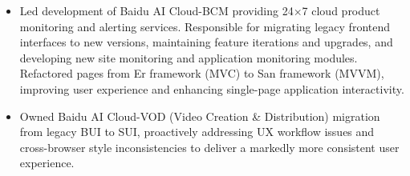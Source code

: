 \documentclass{resume}
\newcommand{\en}[1]{#1}
\newcommand{\zh}[1]{}
\begin{document}
\en{}
\zh{\datedsubsection{\textbf{\href{https://cloud.baidu.com/}{百度智能云（Baidu AI Cloud）}}}{2021/01 -- 2021/08}}
\en{}
\zh{\role{ACG 建站与云市场部}{前端研发实习}}
\begin{itemize}
    \item \en{Led development of Baidu AI Cloud-BCM providing 24×7 cloud product monitoring and alerting services. Responsible for migrating legacy frontend interfaces to new versions, maintaining feature iterations and upgrades, and developing new site monitoring and application monitoring modules. Refactored pages from Er framework (MVC) to San framework (MVVM), improving user experience and enhancing single-page application interactivity.}
          \zh{负责百度智能云-云监控 BCM，提供 7x24 小时的云产品报警监控服务，负责对老版本前端界面迁移至新版本的开发，维护功能的迭代和升级，负责新版站点监控，应用监控等，基于Er 框架（MVC）页面重构至 San (MVVM)框架。提升用户体验，同时提高单页面应用交互能力。}
    \item \en{Owned Baidu AI Cloud-VOD (Video Creation \& Distribution) migration from legacy BUI to SUI, proactively addressing UX workflow issues and cross-browser style inconsistencies to deliver a markedly more consistent user experience.}
          \zh{负责百度智能云-视频创作分发平台 VOD，迁移老式 BUI 组件库至 SUI 组件库，主动提出流程上的体验问题，以及老式组件库对不同浏览器的样式效果不同导致的问题，及时反馈和修复，用户体验一致性显著提升。}
\end{itemize}
\end{document}

